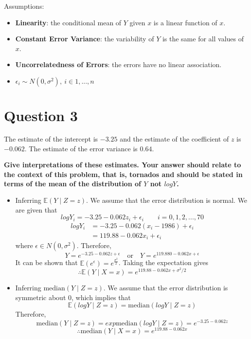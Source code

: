 \documentclass[
]{book}
\providecommand{\tightlist}{%
  \setlength{\itemsep}{0pt}\setlength{\parskip}{0pt}}
\begin{document}
Assumptions:

\begin{itemize}
\tightlist
\item
  \textbf{Linearity}: the conditional mean of \(Y\) given \(x\) is a linear function of \(x\).
\item
  \textbf{Constant Error Variance}: the variability of \(Y\) is the same for all values of \(x\).
\item
  \textbf{Uncorrelatedness of Errors}: the errors have no linear association.
\item
  \(\epsilon_i \sim N(0, \sigma^2), \ i \in 1, ..., n\)
\end{itemize}

\section{Question 3}\label{question-3-5}

The estimate of the intercept is \(-3.25\) and the estimate of the coefficient of \(z\) is \(-0.062\). The estimate of the error variance is \(0.64\).

\textbf{Give interpretations of these estimates. Your answer should relate to the context of this problem, that is, tornados and should be stated in terms of the mean of the distribution of \(Y\) not \(log Y\).}\\

\begin{itemize}
\item
  Inferring \(\mathbb{E}(Y \mid Z = z)\). We assume that the error distribution is normal.
  We are given that
  \[log Y_i = -3.25 - 0.062z_i + \epsilon_i \qquad i = 0, 1, 2, ..., 70\]
  \[
  \begin{aligned}
  log Y_i &= -3.25 - 0.062(x_i -1986) + \epsilon_i \\
        &= 119.88 - 0.062x_i + \epsilon_i
  \end{aligned}
  \]
  where \(\epsilon \in N(0, \sigma^2)\). Therefore,
  \[Y = e^{-3.25-0.062z + \epsilon} \quad \text{or} \quad Y = e^{119.880-0.062x + \epsilon}\]
  It can be shown that \(\mathbb{E}(e^{\epsilon}) = e^{\frac{\sigma^2}{2}}\). Taking the expectation gives
  \[\therefore \mathbb{E}(Y \mid X = x) = e^{119.88 - 0.062x + \sigma^2/2}\]
\item
  Inferring \(\text{median}(Y \mid Z = z)\). We assume that the error distribution is symmetric about 0, which implies that
  \[\mathbb{E}(log Y \mid Z = z) = \text{median}(log Y \mid Z = z)\]
  Therefore,
  \[\text{median}(Y \mid Z = z) = exp{\text{median}(log Y \mid Z = z)} = e^{-3.25-0.062z}\]
  \[\therefore \text{median}(Y \mid X = x) = e^{119.88 - 0.062x}\]
\end{itemize}
\end{document}
